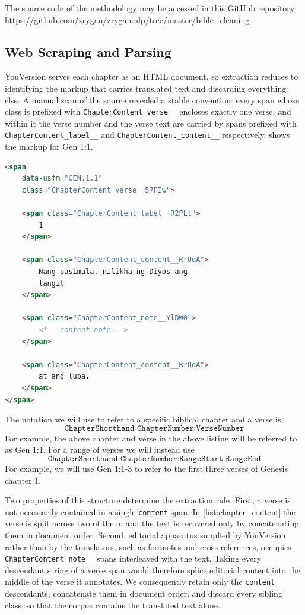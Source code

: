 \documentclass{article}
\begin{document}
The source code of the methodology may be accessed in this GitHub repository:
\url{https://github.com/zrygan/zrygan.nlp/tree/master/bible_cleaning}

\subsection{Web Scraping and Parsing}

YouVersion serves each chapter as an HTML document, so extraction reduces to
identifying the markup that carries translated text and discarding everything
else. A manual scan of the source revealed a stable convention: every span whose
class is prefixed with \texttt{ChapterContent\_verse\_\_} encloses exactly one
verse, and within it the verse number and the verse text are carried by spans
prefixed with \texttt{ChapterContent\_label\_\_} and
\texttt{ChapterContent\_content\_\_} respectively.
 shows the markup for Gen 1:1.

\begin{lstlisting}[language=HTML, caption={\texttt{ChapterContent\_verse\_\_} tag}, label={list:chapter_content}]
<span 
    data-usfm="GEN.1.1"
    class="ChapterContent_verse__57FIw">
    
    <span class="ChapterContent_label__R2PLt">
        1
    </span>
    
    <span class="ChapterContent_content__RrUqA">
        Nang pasimula, nilikha ng Diyos ang
        langit
    </span>
    
    <span class="ChapterContent_note__YlDW0">
        <!-- content note -->
    </span>
    
    <span class="ChapterContent_content__RrUqA">
        at ang lupa.
    </span>
</span>
\end{lstlisting}

The notation we will use to refer to a specific biblical chapter and a verse is
\[\texttt{ChapterShorthand ChapterNumber:VerseNumber}\]
For example, the above chapter and verse in the above listing will be referred
to as Gen 1:1. For a range of verses we will instead use
\[\texttt{ChapterShorthand ChapterNumber:RangeStart-RangeEnd}\]
For example, we will use Gen 1:1-3 to refer to the first three verses of
Genesis chapter 1.

Two properties of this structure determine the extraction rule. First, a verse is
not necessarily contained in a single \texttt{content} span. In
\cref{list:chapter_content} the verse is split across two of them, and the text
is recovered only by concatenating them in document order. Second, editorial
apparatus supplied by YouVersion rather than by the translators, such as
footnotes and cross-references, occupies \texttt{ChapterContent\_note\_\_} spans
interleaved with the text. Taking every descendant string of a verse span would
therefore splice editorial content into the middle of the verse it annotates. We
consequently retain only the \texttt{content} descendants, concatenate them in
document order, and discard every sibling class, so that the corpus contains the
translated text alone.
\end{document}
